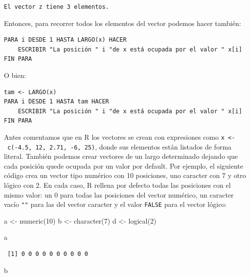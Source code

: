 \documentclass[
]{book}
\newenvironment{Shaded}{\begin{snugshade}}{\end{snugshade}}
\newcommand{\DecValTok}[1]{\textcolor[rgb]{0.00,0.00,0.81}{#1}}
\newcommand{\FunctionTok}[1]{\textcolor[rgb]{0.00,0.00,0.00}{#1}}
\newcommand{\NormalTok}[1]{#1}
\newcommand{\OtherTok}[1]{\textcolor[rgb]{0.56,0.35,0.01}{#1}}
\begin{document}
\begin{verbatim}
El vector z tiene 3 elementos.
\end{verbatim}

Entonces, para recorrer todos los elementos del vector podemos hacer también:

\begin{verbatim}
PARA i DESDE 1 HASTA LARGO(x) HACER
    ESCRIBIR "La posición " i "de x está ocupada por el valor " x[i]
FIN PARA
\end{verbatim}

O bien:

\begin{verbatim}
tam <- LARGO(x)
PARA i DESDE 1 HASTA tam HACER
    ESCRIBIR "La posición " i "de x está ocupada por el valor " x[i]
FIN PARA
\end{verbatim}

Antes comentamos que en R los vectores se crean con expresiones como \texttt{x\ \textless{}-\ c(-4.5,\ 12,\ 2.71,\ -6,\ 25)}, donde sus elementos están listados de forma literal. También podemos crear vectores de un largo determinado dejando que cada posición quede ocupada por un valor por default. Por ejemplo, el siguiente código crea un vector tipo numérico con 10 posiciones, uno caracter con 7 y otro lógico con 2. En cada caso, R rellena por defecto todas las posiciones con el mismo valor: un 0 para todas las posiciones del vector numérico, un caracter vacío \texttt{""} para las del vector caracter y el valor \texttt{FALSE} para el vector lógico:

\begin{Shaded}
\begin{Highlighting}[]
\NormalTok{a }\OtherTok{\textless{}{-}} \FunctionTok{numeric}\NormalTok{(}\DecValTok{10}\NormalTok{)}
\NormalTok{b }\OtherTok{\textless{}{-}} \FunctionTok{character}\NormalTok{(}\DecValTok{7}\NormalTok{)}
\NormalTok{d }\OtherTok{\textless{}{-}} \FunctionTok{logical}\NormalTok{(}\DecValTok{2}\NormalTok{)}

\NormalTok{a}
\end{Highlighting}
\end{Shaded}

\begin{verbatim}
 [1] 0 0 0 0 0 0 0 0 0 0
\end{verbatim}

\begin{Shaded}
\begin{Highlighting}[]
\NormalTok{b}
\end{Highlighting}
\end{Shaded}
\end{document}
